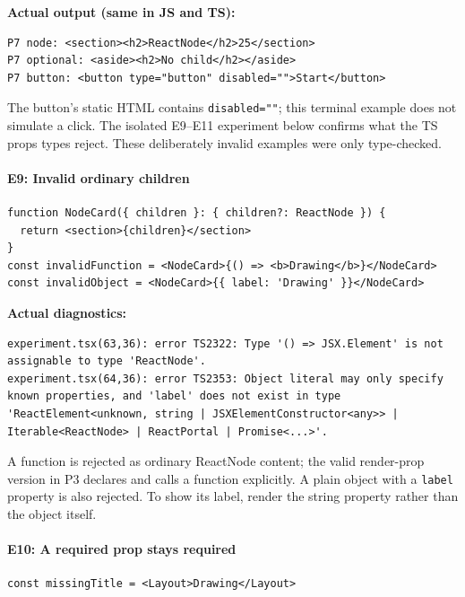 \documentclass[
  11pt,
]{article}
\newcommand{\passthrough}[1]{#1}
\let\originalparagraph\paragraph
\renewcommand{\paragraph}[1]{\originalparagraph{#1}\mbox{}}
\begin{document}
\textbf{Actual output (same in JS and TS):}

\begin{lstlisting}
P7 node: <section><h2>ReactNode</h2>25</section>
P7 optional: <aside><h2>No child</h2></aside>
P7 button: <button type="button" disabled="">Start</button>
\end{lstlisting}

The button's static HTML contains \passthrough{\lstinline!disabled=""!};
this terminal example does not simulate a click. The isolated E9--E11
experiment below confirms what the TS props types reject. These
deliberately invalid examples were only type-checked.

\paragraph{E9: Invalid ordinary
children}\label{e9-invalid-ordinary-children}

\begin{lstlisting}
function NodeCard({ children }: { children?: ReactNode }) {
  return <section>{children}</section>
}
const invalidFunction = <NodeCard>{() => <b>Drawing</b>}</NodeCard>
const invalidObject = <NodeCard>{{ label: 'Drawing' }}</NodeCard>
\end{lstlisting}

\textbf{Actual diagnostics:}

\begin{lstlisting}
experiment.tsx(63,36): error TS2322: Type '() => JSX.Element' is not assignable to type 'ReactNode'.
experiment.tsx(64,36): error TS2353: Object literal may only specify known properties, and 'label' does not exist in type 'ReactElement<unknown, string | JSXElementConstructor<any>> | Iterable<ReactNode> | ReactPortal | Promise<...>'.
\end{lstlisting}

A function is rejected as ordinary ReactNode content; the valid
render-prop version in P3 declares and calls a function explicitly. A
plain object with a \passthrough{\lstinline!label!} property is also
rejected. To show its label, render the string property rather than the
object itself.

\paragraph{E10: A required prop stays
required}\label{e10-a-required-prop-stays-required}

\begin{lstlisting}
const missingTitle = <Layout>Drawing</Layout>
\end{lstlisting}
\end{document}

